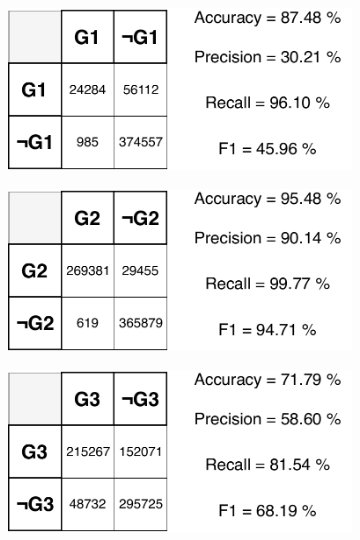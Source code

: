 \begin{figure}[H]

\begin{subfigure}{.33\textwidth}
  \centering
  \includegraphics[width=\textwidth]{tex/images/results/rese_g1_512}  
\end{subfigure}%
\begin{subfigure}{.33\textwidth}
  \centering
  \includegraphics[width=\textwidth]{tex/images/results/rese_g2_512}
\end{subfigure}
\begin{subfigure}{.33\textwidth}
  \centering
  \includegraphics[width=\textwidth]{tex/images/results/rese_g3_512}
\end{subfigure}


\end{figure}
